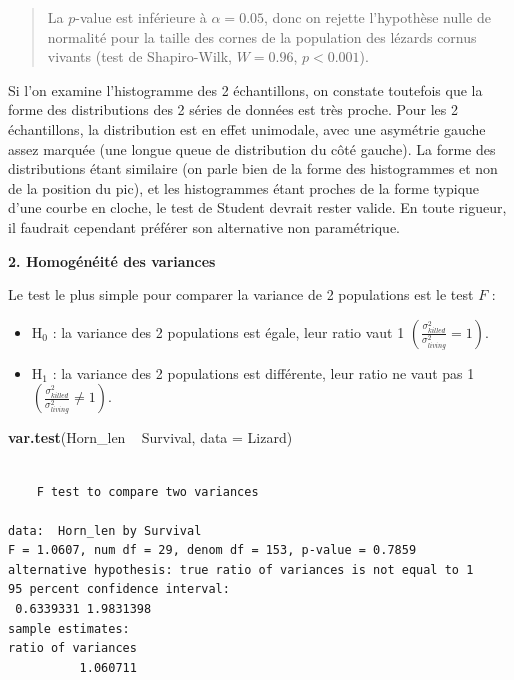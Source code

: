 \documentclass[a4paperpaper,]{article}
\newenvironment{Shaded}{\begin{snugshade}}{\end{snugshade}}
\newcommand{\DataTypeTok}[1]{\textcolor[rgb]{0.00,0.34,0.68}{#1}}
\newcommand{\KeywordTok}[1]{\textcolor[rgb]{0.12,0.11,0.11}{\textbf{#1}}}
\newcommand{\NormalTok}[1]{\textcolor[rgb]{0.12,0.11,0.11}{#1}}
\newcommand{\OperatorTok}[1]{\textcolor[rgb]{0.12,0.11,0.11}{#1}}
\newcommand{\StringTok}[1]{\textcolor[rgb]{0.75,0.01,0.01}{#1}}
\providecommand{\tightlist}{%
  \setlength{\itemsep}{0pt}\setlength{\parskip}{0pt}}
\begin{document}
\begin{quote}
La \(p\)-value est inférieure à \(\alpha = 0.05\), donc on rejette l'hypothèse nulle de normalité pour la taille des cornes de la population des lézards cornus vivants (test de Shapiro-Wilk, \(W = 0.96\), \(p < 0.001\)).
\end{quote}

Si l'on examine l'histogramme des 2 échantillons, on constate toutefois que la forme des distributions des 2 séries de données est très proche. Pour les 2 échantillons, la distribution est en effet unimodale, avec une asymétrie gauche assez marquée (une longue queue de distribution du côté gauche). La forme des distributions étant similaire (on parle bien de la forme des histogrammes et non de la position du pic), et les histogrammes étant proches de la forme typique d'une courbe en cloche, le test de Student devrait rester valide. En toute rigueur, il faudrait cependant préférer son alternative non paramétrique.

\textbf{2. Homogénéité des variances}

Le test le plus simple pour comparer la variance de 2 populations est le test \(F\) :

\begin{itemize}
\tightlist
\item
  H\(_0\) : la variance des 2 populations est égale, leur ratio vaut 1 \(\left(\frac{\sigma^2_{killed}}{\sigma^2_{living}} = 1\right)\).
\item
  H\(_1\) : la variance des 2 populations est différente, leur ratio ne vaut pas 1 \(\left(\frac{\sigma^2_{killed}}{\sigma^2_{living}} \neq 1\right)\).
\end{itemize}

\begin{Shaded}
\begin{Highlighting}[]
\KeywordTok{var.test}\NormalTok{(Horn_len }\OperatorTok{~}\StringTok{ }\NormalTok{Survival, }\DataTypeTok{data =}\NormalTok{ Lizard)}
\end{Highlighting}
\end{Shaded}

\begin{verbatim}

    F test to compare two variances

data:  Horn_len by Survival
F = 1.0607, num df = 29, denom df = 153, p-value = 0.7859
alternative hypothesis: true ratio of variances is not equal to 1
95 percent confidence interval:
 0.6339331 1.9831398
sample estimates:
ratio of variances 
          1.060711 
\end{verbatim}
\end{document}

